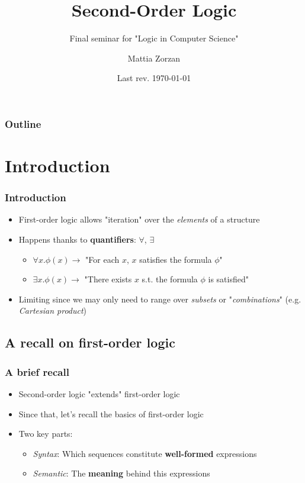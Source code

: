 \documentclass{beamer}
\title{Second-Order Logic}
\subtitle{Final seminar for "Logic in Computer Science"}
\author{Mattia Zorzan}
\institute{University of Verona}
\date{Last rev. \today}
\begin{document}
    \begin{frame}
        \titlepage
    \end{frame}

    \begin{frame}
        \frametitle{Outline}
        \tableofcontents
    \end{frame}

    \section{Introduction}
        \begin{frame}
            \frametitle{Introduction}
            \begin{itemize}
                \item First-order logic allows "iteration" over the \textit{elements} of a structure
                \item Happens thanks to \textbf{quantifiers}: $ \forall $, $ \exists $
                    \begin{itemize}
                        \item $ \forall x. \phi(x) \rightarrow $ "For each $ x $, $ x $ satisfies the formula $ \phi $"
                        \item $ \exists x. \phi(x) \rightarrow $ "There exists $ x $ s.t. the formula $ \phi $ is satisfied"
                    \end{itemize}
                \item Limiting since we may only need to range over \textit{subsets} or "\textit{combinations}" (e.g. \textit{Cartesian product})
            \end{itemize}
        \end{frame}

        \subsection{A recall on first-order logic}
            \begin{frame}
                \frametitle{A brief recall}
                \begin{itemize}
                    \item Second-order logic "extends" first-order logic
                    \item Since that, let's recall the basics of first-order logic
                    \item Two key parts:
                        \begin{itemize}
                            \item \textit{Syntax}: Which sequences constitute \textbf{well-formed} expressions
                            \item \textit{Semantic}: The \textbf{meaning} behind this expressions
                        \end{itemize}
                \end{itemize}
            \end{frame}
\end{document}
